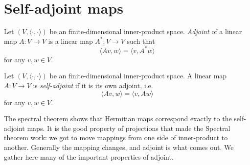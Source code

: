 \section{Self-adjoint maps}

\begin{maar}
	Let $(V, \langle \cdot, \cdot \rangle)$ be an finite-dimensional inner-product space. \textit{Adjoint} of a linear map $A : V \to V$ is a linear map $A^{*} : V \to V$ such that
	\[
		\langle A v, w \rangle = \langle v, A^{*} w \rangle
	\]
	for any $v, w \in V$.
\end{maar}

\begin{maar}
	Let $(V, \langle \cdot, \cdot \rangle)$ be an finite-dimensional inner-product space. A linear map $A : V \to V$ is \textit{self-adjoint} if it is its own adjoint, i.e.
	\[
		\langle A v, w \rangle = \langle v, A w \rangle
	\]
	for any $v, w \in V$.
\end{maar}

The spectral theorem shows that Hermitian maps correspond exactly to the self-adjoint maps. It is the good property of projections that made the Spectral theorem work: we got to move mappings from one side of inner-product to another. Generally the mapping changes, and adjoint is what comes out. We gather here many of the important properties of adjoint.

